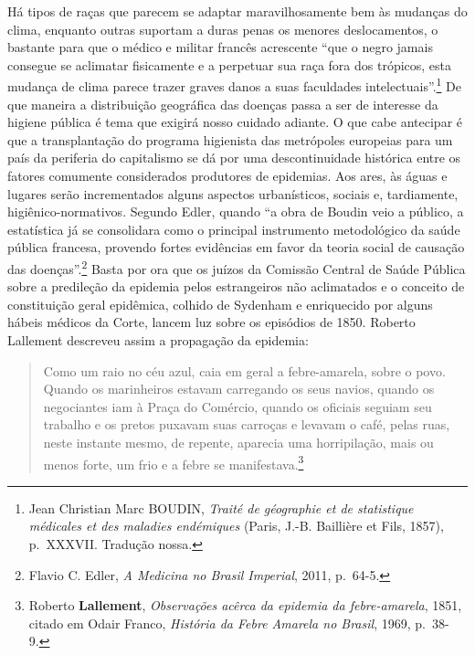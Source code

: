 Há tipos de raças que parecem se adaptar maravilhosamente bem às
mudanças do clima, enquanto outras suportam a duras penas os menores
deslocamentos, o bastante para que o médico e militar francês acrescente
``que o negro jamais consegue se aclimatar fisicamente e a perpetuar sua
raça fora dos trópicos, esta mudança de clima parece trazer graves danos
a suas faculdades intelectuais''.\footnote{Jean Christian Marc BOUDIN,
  \textit{Traité de géographie et de statistique médicales et des maladies
  endémiques} (Paris, J.-B. Baillière et Fils, 1857), p.~XXXVII.
  Tradução nossa.} De que maneira a distribuição geográfica das doenças
passa a ser de interesse da higiene pública é tema que exigirá nosso
cuidado adiante. O que cabe antecipar é que a transplantação do programa
higienista das metrópoles europeias para um país da periferia do
capitalismo se dá por uma descontinuidade histórica entre os fatores
comumente considerados produtores de epidemias. Aos ares, às águas e
lugares serão incrementados alguns aspectos urbanísticos, sociais e,
tardiamente, higiênico-normativos. Segundo Edler, quando ``a obra de
Boudin veio a público, a estatística já se consolidara como o principal
instrumento metodológico da saúde pública francesa, provendo fortes
evidências em favor da teoria social de causação das
doenças''.\footnote{Flavio C. Edler, \textit{A Medicina no Brasil
  Imperial}, 2011, p.~64-5.} Basta por ora que os juízos da Comissão
Central de Saúde Pública sobre a predileção da epidemia pelos
estrangeiros não aclimatados e o conceito de constituição geral
epidêmica, colhido de Sydenham e enriquecido por alguns hábeis médicos
da Corte, lancem luz sobre os episódios de 1850. Roberto Lallement
descreveu assim a propagação da epidemia:

\begin{quote}
Como um raio no céu azul, caia em geral a febre-amarela, sobre o povo.
Quando os marinheiros estavam carregando os seus navios, quando os
negociantes iam à Praça do Comércio, quando os oficiais seguiam seu
trabalho e os pretos puxavam suas carroças e levavam o café, pelas ruas,
neste instante mesmo, de repente, aparecia uma horripilação, mais ou
menos forte, um frio e a febre se manifestava.\footnote{Roberto
  \textbf{Lallement}, \textit{Observações acêrca da epidemia da
  febre-amarela}, 1851, citado em Odair Franco, \textit{História da Febre
  Amarela no Brasil}, 1969, p.~38-9.}
\end{quote}

